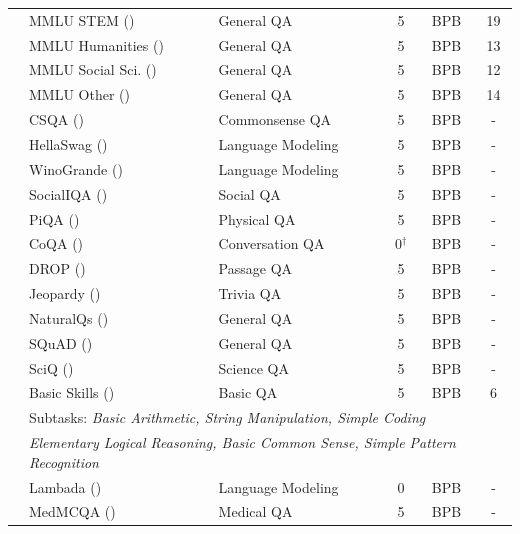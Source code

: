 \begin{table}[t]
\begin{scriptsize}
\begin{tabular}{lllccc}
\rowcolor{ai2offwhite} & MMLU STEM (\citeyear{hendryckstest2021}) & General QA & 5 & BPB & 19 \\
\rowcolor{ai2offwhite} & MMLU Humanities (\citeyear{hendryckstest2021}) & General QA & 5 & BPB & 13 \\
\rowcolor{ai2offwhite} & MMLU Social Sci. (\citeyear{hendryckstest2021}) & General QA & 5 & BPB & 12 \\
\rowcolor{ai2offwhite} & MMLU Other (\citeyear{hendryckstest2021}) & General QA & 5 & BPB & 14 \\
\rowcolor{ai2offwhite} & CSQA (\citeyear{talmor-etal-2019-commonsenseqa}) & Commonsense QA & 5 & BPB & - \\
\rowcolor{ai2offwhite} & HellaSwag (\citeyear{zellers-etal-2019-hellaswag}) & Language Modeling & 5 & BPB & - \\
\rowcolor{ai2offwhite} & WinoGrande (\citeyear{Sakaguchi_Le_Bras_Bhagavatula_Choi_2020}) & Language Modeling & 5 & BPB & - \\
\rowcolor{ai2offwhite} & SocialIQA (\citeyear{sap-etal-2019-social}) & Social QA & 5 & BPB & - \\
\rowcolor{ai2offwhite} & PiQA (\citeyear{Bisk_Zellers_Le_bras_Gao_Choi_2020}) & Physical QA & 5 & BPB & - \\
\rowcolor{ai2offwhite} & CoQA (\citeyear{reddy-etal-2019-coqa}) & Conversation QA & 0$^\dagger$ & BPB & - \\
\rowcolor{ai2offwhite} & DROP (\citeyear{dua-etal-2019-drop}) & Passage QA & 5 & BPB & - \\
\rowcolor{ai2offwhite} & Jeopardy (\citeyear{mosaic-jeopardy}) & Trivia QA & 5 & BPB & - \\
\rowcolor{ai2offwhite} & NaturalQs (\citeyear{kwiatkowski-etal-2019-natural}) & General QA & 5 & BPB & - \\
\rowcolor{ai2offwhite} & SQuAD (\citeyear{rajpurkar-etal-2016-squad}) & General QA & 5 & BPB & - \\
\rowcolor{ai2offwhite} & SciQ (\citeyear{welbl-etal-2017-crowdsourcing}) & Science QA & 5 & BPB & - \\
\rowcolor{ai2offwhite} & Basic Skills (\citeyear{olmo2025olmo3}) & Basic QA & 5 & BPB & 6 \\
\rowcolor{ai2offwhite} & \multicolumn{5}{l}{\hspace{6pt}Subtasks: \textit{Basic Arithmetic, String Manipulation, Simple Coding} } \\
\rowcolor{ai2offwhite} & \multicolumn{5}{l}{\hspace{6pt}\textit{Elementary Logical Reasoning, Basic Common Sense, Simple Pattern Recognition} } \\
\rowcolor{ai2offwhite} & Lambada (\citeyear{paperno2016lambada}) & Language Modeling & 0 & BPB & - \\
\rowcolor{ai2offwhite} \multirow{-23}{*}{\rotatebox[origin=c]{90}{\textit{QA}}} & MedMCQA (\citeyear{pmlr-v174-pal22a}) & Medical QA & 5 & BPB & - \\
\bottomrule
\end{tabular}
\end{scriptsize}
  \vspace{6pt}
  \label{tab:eval_suite}
\end{table}
